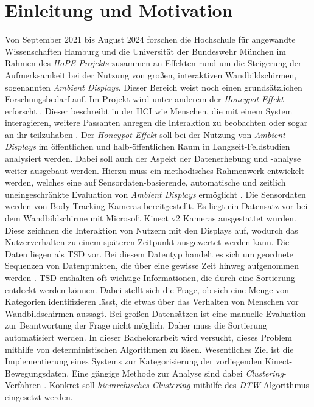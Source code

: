 \chapter{Einleitung und Motivation}
\label{chapter1}
Von September 2021 bis August 2024 forschen die Hochschule für angewandte Wissenschaften Hamburg
und die Universität der Bundeswehr München im Rahmen des \emph{HoPE-Projekts} zusammen an Effekten
rund um die Steigerung der Aufmerksamkeit bei der Nutzung von großen, interaktiven Wandbildschirmen,
sogenannten \emph{Ambient Displays}.
Dieser Bereich weist noch einen grundsätzlichen Forschungsbedarf auf.
Im Projekt wird unter anderem der \emph{Honeypot-Effekt} erforscht \citep{unibw_honeypot-effekt_2021}.
Dieser beschreibt in der \ac{HCI} wie Menschen, die mit einem System interagieren,
weitere Passanten anregen die Interaktion zu beobachten oder sogar an ihr teilzuhaben \citep{wouters_uncovering_2016}.
Der \emph{Honeypot-Effekt} soll bei der Nutzung von \emph{Ambient Displays} im öffentlichen
und halb-öffentlichen Raum in Langzeit-Feldstudien analysiert werden.
Dabei soll auch der Aspekt der Datenerhebung und -analyse weiter ausgebaut werden.
Hierzu muss ein methodisches Rahmenwerk entwickelt werden, welches eine auf Sensordaten-basierende,
automatische und zeitlich uneingeschränkte Evaluation von \emph{Ambient Displays} ermöglicht \citep{unibw_honeypot-effekt_2021}.
Die Sensordaten werden von Body-Tracking-Kameras bereitgestellt.
Es liegt ein Datensatz vor bei dem Wandbildschirme mit Microsoft Kinect v2 Kameras ausgestattet wurden.
Diese zeichnen die Interaktion von Nutzern mit den Displays auf,
wodurch das Nutzerverhalten zu einem späteren Zeitpunkt ausgewertet werden kann.
Die Daten liegen als \ac{TSD} vor.
Bei diesem Datentyp handelt es sich um geordnete Sequenzen von Datenpunkten,
die über eine gewisse Zeit hinweg aufgenommen werden \citep{ali_clustering_2019}.
\ac{TSD} enthalten oft wichtige Informationen, die durch eine Sortierung entdeckt werden können.
Dabei stellt sich die Frage, ob sich eine Menge von Kategorien identifizieren lässt,
die etwas über das Verhalten von Menschen vor Wandbildschirmen aussagt.
Bei großen Datensätzen ist eine manuelle Evaluation zur Beantwortung der Frage nicht möglich.
Daher muss die Sortierung automatisiert werden.
In dieser Bachelorarbeit wird versucht, dieses Problem mithilfe von deterministischen Algorithmen zu lösen.
Wesentliches Ziel ist die Implementierung eines Systems zur Kategorisierung der vorliegenden Kinect-Bewegungsdaten.
Eine gängige Methode zur Analyse sind dabei \emph{Clustering}-Verfahren \citep{aghabozorgi_time-series_2015}.
Konkret soll \emph{hierarchisches Clustering} mithilfe des \emph{\ac{DTW}}-Algorithmus eingesetzt werden.

